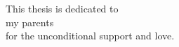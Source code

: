 \begin{dedication}
This thesis is dedicated to\\
 my parents\\
for the unconditional support and love.\\
\end{dedication}
